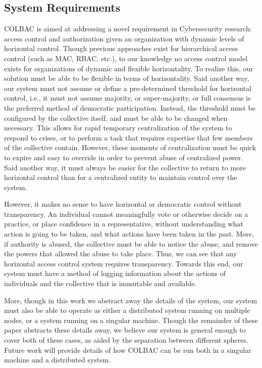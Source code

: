 \subsection{System Requirements}
\label{sec:colbacrequirements}
COLBAC is aimed at addressing a novel requirement in Cybersecurity research:
access control and authorization given an organization with dynamic levels of
horizontal control. Though previous approaches exist for hierarchical access
control (such as MAC, RBAC, etc.), to our knowledge no access control model
exists for organizations of dynamic and flexible horizontality. To realize
this, our solution must be able to be flexible in terms of horizontality. Said
another way, our system must not assume or define a pre-determined threshold for
horizontal control, i.e., it must not assume majority, or super-majority, or
full consensus is the preferred method of democratic participation. Instead,
the threshold must be configured by the collective itself, and must be able to
be changed when necessary. This allows for rapid temporary centralization of the
system to respond to crises, or to perform a task that requires expertise that
few members of the collective contain. However, these moments of centralization
must be quick to expire and easy to override in order to prevent abuse of
centralized power. Said another way, it must always be easier for the collective
to return to more horizontal control than for a centralized entity to maintain
control over the system.

However, it makes no sense to have horizontal or democratic control without
transparency. An individual cannot meaningfully vote or otherwise decide on a
practice, or place confidence in a representative, without understanding what
action is going to be taken, and what actions have been taken in the past.
More, if authority is abused, the collective must be able to notice the abuse,
and remove the powers that allowed the abuse to take place. Thus, we can see
that any horizontal access control system requires transparency. Towards this
end, our system must have a method of logging information about the actions of
individuals and the collective that is immutable and available.

More, though in this work we abstract away the details of the system, our system
must also be able to operate as either a distributed system running on multiple
nodes, or a system running on a singular machine. Though the remainder of these
paper abstracts these details away, we believe our system is general enough to
cover both of these cases, as aided by the separation between different spheres.
Future work will provide details of how COLBAC can be run both in a singular
machine and a distributed system.

